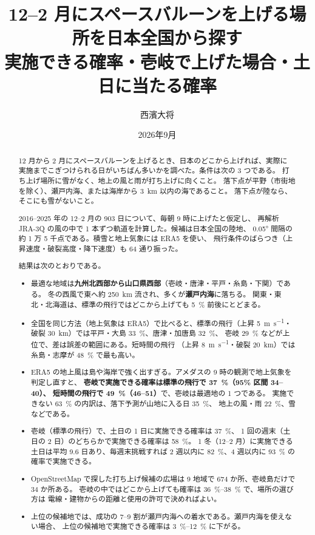 \documentclass[paper=a4, fontsize=10pt, jafontsize=10pt]{jlreq}
\title{12--2 月にスペースバルーンを上げる場所を日本全国から探す\\
\large 実施できる確率・壱岐で上げた場合・土日に当たる確率}
\author{西濱大将}
\date{2026年9月}
\begin{document}
\maketitle

\begin{abstract}
12 月から 2 月にスペースバルーンを上げるとき、日本のどこから上げれば、実際に
実施までこぎつけられる日がいちばん多いかを調べた。条件は次の 3 つである。
打ち上げ場所に雪がなく、地上の風と雨が打ち上げに向くこと。
落下点が平野（市街地を除く）、瀬戸内海、または海岸から \SI{3}{\kilo\metre} 以内の海であること。
落下点が陸なら、そこにも雪がないこと。

2016--2025 年の 12--2 月の 903 日について、毎朝 9 時に上げたと仮定し、
再解析 JRA-3Q の風の中で 1 本ずつ軌道を計算した。候補は日本全国の陸地、
\ang{0.05} 間隔の約 1 万 5 千点である。積雪と地上気象には ERA5 を使い、
飛行条件のばらつき（上昇速度・破裂高度・降下速度）も 64 通り振った。

結果は次のとおりである。
\begin{itemize}
  \item 最適な地域は\textbf{九州北西部から山口県西部}（壱岐・唐津・平戸・糸島・下関）である。
    冬の西風で東へ約 \SI{250}{\kilo\metre} 流され、多くが\textbf{瀬戸内海}に落ちる。
    関東・東北・北海道は、標準の飛行ではどこから上げても \SI{5}{\percent} 前後にとどまる。
  \item 全国を同じ方法（地上気象は ERA5）で比べると、標準の飛行（上昇 \SI{5}{\metre\per\second}・
    破裂 \SI{30}{\kilo\metre}）では平戸・大島 \SI{33}{\percent}、唐津・加唐島 \SI{32}{\percent}、
    壱岐 \SI{29}{\percent} などが上位で、差は誤差の範囲にある。短時間の飛行
    （上昇 \SI{8}{\metre\per\second}・破裂 \SI{20}{\kilo\metre}）では糸島・志摩が \SI{48}{\percent} で最も高い。
  \item ERA5 の地上風は島や海岸で強く出すぎる。アメダスの 9 時の観測で地上気象を判定し直すと、
    \textbf{壱岐で実施できる確率は標準の飛行で \SI{37}{\percent}（95\% 区間 34--40）、
    短時間の飛行で \SI{49}{\percent}（46--51）}で、壱岐は最適地の 1 つである。
    実施できない \SI{63}{\percent} の内訳は、落下予測が山地に入る日 \SI{35}{\percent}、
    地上の風・雨 \SI{22}{\percent}、雪などである。
  \item 壱岐（標準の飛行）で、土日の 1 日に実施できる確率は \SI{37}{\percent}、
    1 回の週末（土日の 2 日）のどちらかで実施できる確率は \SI{58}{\percent}。
    1 冬（12--2 月）に実施できる土日は平均 9.6 日あり、毎週末挑戦すれば
    2 週以内に \SI{82}{\percent}、4 週以内に \SI{93}{\percent} の確率で実施できる。
  \item OpenStreetMap で探した打ち上げ候補の広場は 9 地域で 674 か所、壱岐島だけで 34 か所ある。
    壱岐の中ではどこから上げても確率は \SIrange{36}{38}{\percent} で、場所の選び方は
    電線・建物からの距離と使用の許可で決めればよい。
  \item 上位の候補地では、成功の 7--9 割が瀬戸内海への着水である。瀬戸内海を使えない場合、
    上位の候補地で実施できる確率は \SIrange{3}{12}{\percent} に下がる。
\end{itemize}
\end{abstract}

\tableofcontents
\clearpage









\end{document}
